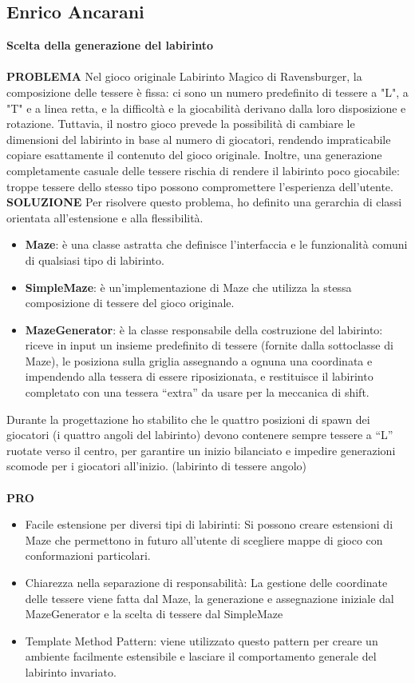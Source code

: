 \documentclass[a4paper,12pt]{report}
\begin{document}
\subsection{Enrico Ancarani}
\textbf{Scelta della generazione del labirinto}
\\
\\
\textbf{PROBLEMA}
Nel gioco originale Labirinto Magico di Ravensburger, la composizione delle tessere è fissa: ci sono un numero predefinito di tessere a "L", a "T" e a linea retta, 
e la difficoltà e la giocabilità derivano dalla loro disposizione e rotazione. Tuttavia, il nostro gioco prevede la possibilità di cambiare le dimensioni del labirinto 
in base al numero di giocatori, rendendo impraticabile copiare esattamente il contenuto del gioco originale.
Inoltre, una generazione completamente casuale delle tessere rischia di rendere il labirinto poco giocabile: troppe tessere dello stesso tipo 
possono compromettere l’esperienza dell’utente.\\

\textbf{SOLUZIONE}
Per risolvere questo problema, ho definito una gerarchia di classi orientata all’estensione e alla flessibilità.
\begin{itemize}
	\item \textbf{Maze}: è una classe astratta che definisce l’interfaccia e le funzionalità comuni di qualsiasi tipo di labirinto.
	\item \textbf{SimpleMaze}: è un’implementazione di Maze che utilizza la stessa composizione di tessere del gioco originale.
	\item \textbf{MazeGenerator}: è la classe responsabile della costruzione del labirinto: riceve in input un insieme predefinito di tessere 
	(fornite dalla sottoclasse di Maze), le posiziona sulla griglia assegnando a ognuna una coordinata e impendendo alla tessera di 
	essere riposizionata, e restituisce il labirinto completato con una tessera “extra” da usare per la meccanica di shift.
\end{itemize}
Durante la progettazione ho stabilito che le quattro posizioni di spawn dei giocatori (i quattro angoli del labirinto) 
devono contenere sempre tessere a “L” ruotate verso il centro, per garantire un inizio bilanciato e impedire generazioni scomode per i giocatori all'inizio. (labirinto di tessere angolo)
\\
\\
\textbf{PRO}
\begin{itemize}
	\item Facile estensione per diversi tipi di labirinti: Si possono creare estensioni di Maze che permettono in futuro all'utente di scegliere mappe di gioco con conformazioni 
	particolari.
	\item Chiarezza nella separazione di responsabilità: La gestione delle coordinate delle tessere viene fatta dal Maze, la generazione e assegnazione iniziale dal MazeGenerator e 
	la scelta di tessere dal SimpleMaze
	\item Template Method Pattern: viene utilizzato questo pattern per creare un ambiente facilmente estensibile e lasciare il comportamento generale del labirinto invariato.
\end{itemize}
\end{document}
